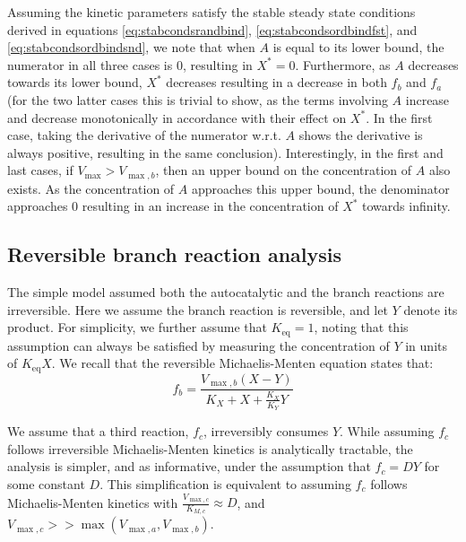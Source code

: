   Assuming the kinetic parameters satisfy the stable steady state conditions derived in equations \ref{eq:stabcondsrandbind}, \ref{eq:stabcondsordbindfst}, and \ref{eq:stabcondsordbindsnd}, we note that when $A$ is equal to its lower bound, the numerator in all three cases is $0$, resulting in $X^*=0$.
  Furthermore, as $A$ decreases towards its lower bound, $X^*$ decreases resulting in a decrease in both $f_b$ and $f_a$ (for the two latter cases this is trivial to show, as the terms involving $A$ increase and decrease monotonically in accordance with their effect on $X^*$. In the first case, taking the derivative of the numerator w.r.t. $A$ shows the derivative is always positive, resulting in the same conclusion).
  Interestingly, in the first and last cases, if $V_{\max}>V_{\max,b}$, then an upper bound on the concentration of $A$ also exists.
  As the concentration of $A$ approaches this upper bound, the denominator approaches $0$ resulting in an increase in the concentration of $X^*$ towards infinity.

\subsection{Reversible branch reaction analysis}
    The simple model assumed both the autocatalytic and the branch reactions are irreversible.
    Here we assume the branch reaction is reversible, and let $Y$ denote its product.
    For simplicity, we further assume that $K_{\text{eq}}=1$, noting that this assumption can always be satisfied by measuring the concentration of $Y$ in units of $K_{\text{eq}}X$.
    We recall that the reversible Michaelis-Menten equation states that:
   \begin{equation*}
       f_b=\frac{V_{\max,b}(X-Y)}{K_X+X+\frac{K_X}{K_Y}Y}
   \end{equation*}

   We assume that a third reaction, $f_c$, irreversibly consumes $Y$.
   While assuming $f_c$ follows irreversible Michaelis-Menten kinetics is analytically tractable, the analysis is simpler, and as informative, under the assumption that $f_c=DY$ for some constant $D$.
   This simplification is equivalent to assuming $f_c$ follows Michaelis-Menten kinetics with $\frac{V_{\max,c}}{K_{M,c}} \approx D$, and $V_{\max,c} >> \max(V_{\max,a},V_{\max,b})$.

